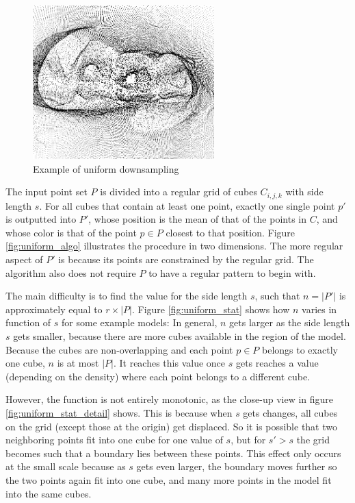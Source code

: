 \documentclass[a4paper,10pt,abstracton,notitlepage]{scrreprt}
\begin{document}
\begin{figure}
\includegraphics[width=7cm,frame]{uniform_example_inv.png}
\caption{Example of uniform downsampling}
\label{fig:uniform_example}
\end{figure}
The input point set $P$ is divided into a regular grid of cubes $C_{i,j,k}$ with side length $s$. For all cubes that contain at least one point, exactly one single point $p'$ is outputted into $P'$, whose position is the mean of that of the points in $C$, and whose color is that of the point $p \in P$ closest to that position. Figure \ref{fig:uniform_algo} illustrates the procedure in two dimensions. The more regular aspect of $P'$ is because its points are constrained by the regular grid. The algorithm also does not require $P$ to have a regular pattern to begin with.

The main difficulty is to find the value for the side length $s$, such that $n = |P'|$ is approximately equal to $r \times |P|$. Figure \ref{fig:uniform_stat} shows how $n$ varies in function of $s$ for some example models: In general, $n$ gets larger as the side length $s$ gets smaller, because there are more cubes available in the region of the model. Because the cubes are non-overlapping and each point $p \in P$ belongs to exactly one cube, $n$ is at most $|P|$. It reaches this value once $s$ gets reaches a value (depending on the density) where each point belongs to a different cube.

However, the function is not entirely monotonic, as the close-up view in figure \ref{fig:uniform_stat_detail} shows. This is because when $s$ gets changes, all cubes on the grid (except those at the origin) get displaced. So it is possible that two neighboring points fit into one cube for one value of $s$, but for $s' > s$ the grid becomes such that a boundary lies between these points. This effect only occurs at the small scale because as $s$ gets even larger, the boundary moves further so the two points again fit into one cube, and many more points in the model fit into the same cubes.
\end{document}
